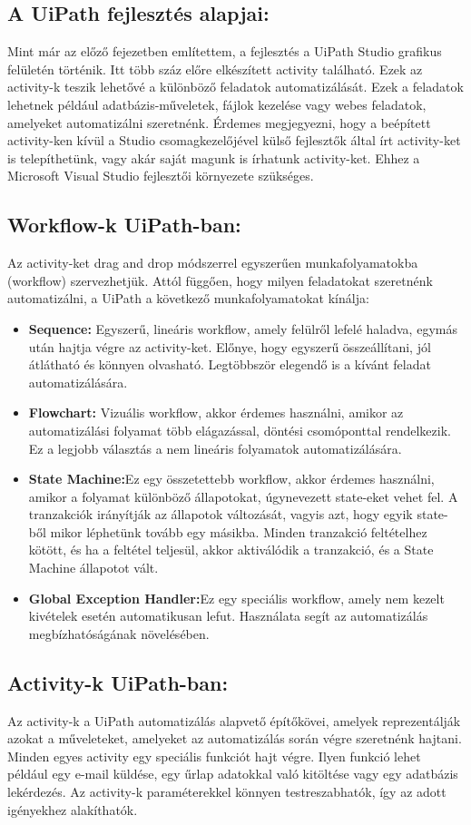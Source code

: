 \documentclass[
]{thesis-ekf}
\theoremstyle{definition}
\theoremstyle{remark}
\begin{document}
\subsection{A UiPath fejlesztés alapjai:}
Mint már az előző fejezetben említettem, a fejlesztés a UiPath Studio grafikus felületén történik. Itt több száz előre elkészített activity található. Ezek az activity-k teszik lehetővé a különböző feladatok automatizálását. Ezek a feladatok lehetnek például adatbázis-műveletek, fájlok kezelése vagy webes feladatok, amelyeket automatizálni szeretnénk. Érdemes megjegyezni, hogy a beépített activity-ken kívül a Studio csomagkezelőjével külső fejlesztők által írt activity-ket is telepíthetünk, vagy akár saját magunk is írhatunk activity-ket. Ehhez a Microsoft Visual Studio fejlesztői környezete szükséges.  
\subsection*{Workflow-k UiPath-ban: \cite{Workflow}}
Az activity-ket drag and drop módszerrel egyszerűen munkafolyamatokba (workflow) szervezhetjük. Attól függően, hogy milyen feladatokat szeretnénk automatizálni, a UiPath a következő munkafolyamatokat kínálja:
\begin{itemize}
	\item\textbf{Sequence:} Egyszerű, lineáris workflow, amely felülről lefelé haladva, egymás után hajtja végre az activity-ket. Előnye, hogy egyszerű összeállítani, jól átlátható és könnyen olvasható. Legtöbbször elegendő is a kívánt feladat automatizálására.
	\item \textbf{Flowchart:} Vizuális workflow, akkor érdemes használni, amikor az automatizálási folyamat több elágazással, döntési csomóponttal rendelkezik. Ez a legjobb választás a nem lineáris folyamatok automatizálására. 
	\item \textbf{State Machine:}Ez egy összetettebb workflow, akkor érdemes használni, amikor a folyamat különböző állapotokat, úgynevezett state-eket vehet fel. A tranzakciók irányítják az állapotok változását, vagyis azt, hogy egyik state-ből mikor léphetünk tovább egy másikba. Minden tranzakció feltételhez kötött, és ha a feltétel teljesül, akkor aktiválódik a tranzakció, és a State Machine állapotot vált.
	\item \textbf{Global Exception Handler:}Ez egy speciális workflow, amely nem kezelt kivételek esetén automatikusan lefut. Használata segít az automatizálás megbízhatóságának növelésében.
\end{itemize}	
\subsection*{Activity-k UiPath-ban: \cite{Activity}}
Az activity-k a UiPath automatizálás alapvető építőkövei, amelyek reprezentálják azokat a műveleteket, amelyeket az automatizálás során végre szeretnénk hajtani. Minden egyes activity egy speciális funkciót hajt végre. Ilyen funkció lehet például egy e-mail küldése, egy űrlap adatokkal való kitöltése vagy egy adatbázis lekérdezés. Az activity-k paraméterekkel könnyen testreszabhatók, így az adott igényekhez alakíthatók.
\end{document}

